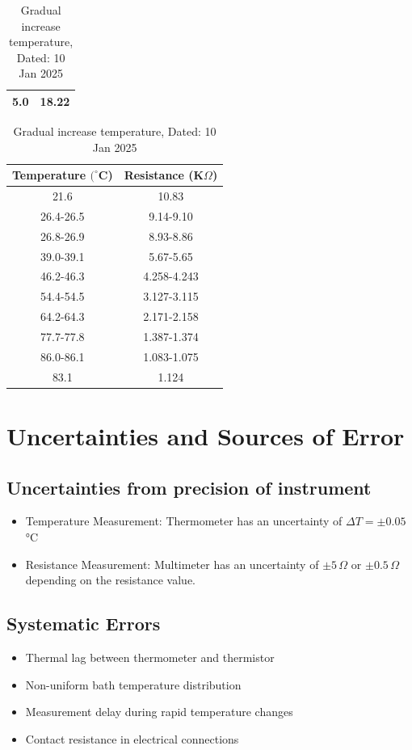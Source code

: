 \documentclass[%
 sor,
 jor,
 amsmath,amssymb,
 reprint,%
]{revtex4-2}
\begin{document}
\begin{table}[ht]
\begin{minipage}{0.48\textwidth}
\begin{tabular}{|c|c|}
        5.0 & 18.22 \\ 
        \hline
    \end{tabular}
    \caption{Gradual decrease temperature till 60\si{\celsius}, and cooled using ice, Dated: 8 Jan 2025 }
    \vspace{1.61cm}
    \begin{tabular}{|c|c|}
        \hline
        Temperature $(^\circ$C) & Resistance (K$\Omega$) \\ 
        \hline
        21.6 & 10.83 \\ 
        26.4-26.5 & 9.14-9.10 \\ 
        26.8-26.9 & 8.93-8.86 \\ 
        39.0-39.1 & 5.67-5.65 \\ 
        46.2-46.3 & 4.258-4.243 \\ 
        54.4-54.5 & 3.127-3.115 \\ 
        64.2-64.3 & 2.171-2.158 \\ 
        77.7-77.8 & 1.387-1.374 \\ 
        86.0-86.1 & 1.083-1.075 \\ 
        83.1 & 1.124 \\ 
        \hline
\end{tabular}
\caption{Gradual increase temperature, Dated: 10 Jan 2025 }
\end{minipage}
\hfill
\end{table}



\section{Uncertainties and Sources of Error}
\subsection{Uncertainties from precision of instrument}
\begin{itemize}
    \item Temperature Measurement:
    Thermometer has an uncertainty of $\Delta T = \pm 0.05$ \si{\celsius}
    \item Resistance Measurement: 
    Multimeter has an uncertainty of $\pm5\,\Omega$ or $\pm0.5\,\Omega$ depending on the resistance value.
\end{itemize}

\subsection{Systematic Errors}
\begin{itemize}
    \item Thermal lag between thermometer and thermistor
    \item Non-uniform bath temperature distribution
    \item Measurement delay during rapid temperature changes
    \item Contact resistance in electrical connections
\end{itemize}
\end{document}
